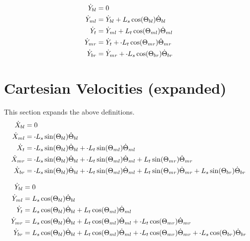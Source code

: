 \documentclass[11pt, landscape]{article}
\newcommand{\mn}{\scalebox{0.7}[1.0]{-}}
\begin{document}
\begin{align}                                                                          
  \dot{Y}_{bl} &= 0 \\                                                        
  \dot{Y}_{ml} &= \dot{Y}_{bl} + L_{s}\cos(\Theta_{bl})\dot{\Theta}_{bl} \\
  \dot{Y}_{t}  &= \dot{Y}_{ml} + L_{t}\cos(\Theta_{ml})\dot{\Theta}_{ml} \\
  \dot{Y}_{mr} &= \dot{Y}_{t } + \mn L_{t}\cos(\Theta_{mr})\dot{\Theta}_{mr} \\
  \dot{Y}_{br} &= \dot{Y}_{mr} + \mn L_{s}\cos(\Theta_{br})\dot{\Theta}_{br}
\end{align}


\section{Cartesian Velocities (expanded)}
This section expands the above definitions. \\
\begin{align}
  \dot{X}_{bl} &= 0 \\
  \dot{X}_{ml} &= \mn L_{s}\sin(\Theta_{bl})\dot{\Theta}_{bl} \\
  \dot{X}_{t } &= \mn L_{s}\sin(\Theta_{bl})\dot{\Theta}_{bl} + \mn L_{t}\sin(\Theta_{ml})\dot{\Theta}_{ml} \\
  \dot{X}_{mr} &= \mn L_{s}\sin(\Theta_{bl})\dot{\Theta}_{bl} + \mn L_{t}\sin(\Theta_{ml})\dot{\Theta}_{ml} + L_{t}\sin(\Theta_{mr})\dot{\Theta}_{mr} \\
  \dot{X}_{br} &= \mn L_{s}\sin(\Theta_{bl})\dot{\Theta}_{bl} + \mn L_{t}\sin(\Theta_{ml})\dot{\Theta}_{ml} + L_{t}\sin(\Theta_{mr})\dot{\Theta}_{mr} + L_{s}\sin(\Theta_{br})\dot{\Theta}_{br}
\end{align}             
             
\begin{align}                                                                               
  \dot{Y}_{bl} &= 0 \\                                                               
  \dot{Y}_{ml} &= L_{s}\cos(\Theta_{bl})\dot{\Theta}_{bl} \\
  \dot{Y}_{t}  &= L_{s}\cos(\Theta_{bl})\dot{\Theta}_{bl} + L_{t}\cos(\Theta_{ml})\dot{\Theta}_{ml} \\
  \dot{Y}_{mr} &= L_{s}\cos(\Theta_{bl})\dot{\Theta}_{bl} + L_{t}\cos(\Theta_{ml})\dot{\Theta}_{ml} + \mn L_{t}\cos(\Theta_{mr})\dot{\Theta}_{mr} \\
  \dot{Y}_{br} &= L_{s}\cos(\Theta_{bl})\dot{\Theta}_{bl} + L_{t}\cos(\Theta_{ml})\dot{\Theta}_{ml} + \mn L_{t}\cos(\Theta_{mr})\dot{\Theta}_{mr} + \mn L_{s}\cos(\Theta_{br})\dot{\Theta}_{br}
\end{align}
\end{document}
